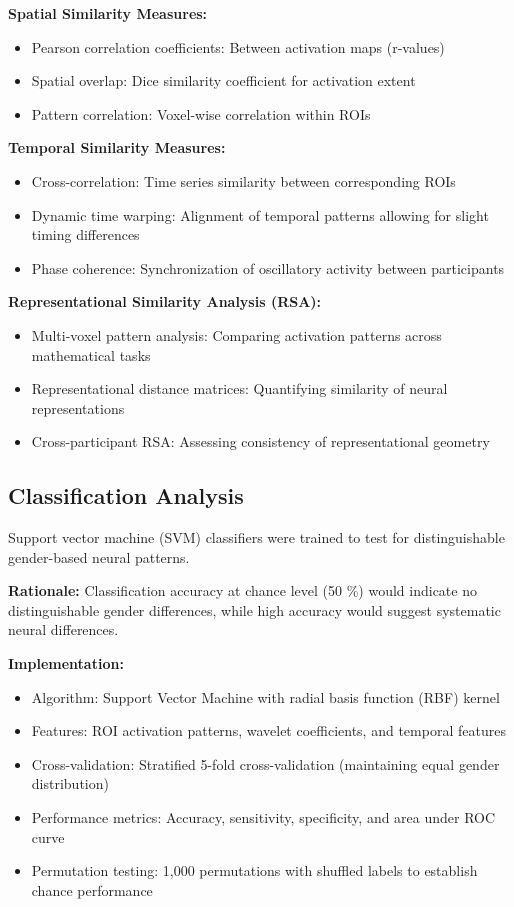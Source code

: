 \vspace{0.5\baselineskip}
\noindent
\textbf{Spatial Similarity Measures:}
\begin{itemize}
\item Pearson correlation coefficients: Between activation maps (r-values)
\item Spatial overlap: Dice similarity coefficient for activation extent
\item Pattern correlation: Voxel-wise correlation within ROIs
\end{itemize}

\noindent
\textbf{Temporal Similarity Measures:}
\begin{itemize}
\item Cross-correlation: Time series similarity between corresponding ROIs
\item Dynamic time warping: Alignment of temporal patterns allowing for slight timing differences
\item Phase coherence: Synchronization of oscillatory activity between participants
\end{itemize}

\noindent
\textbf{Representational Similarity Analysis (RSA):}
\begin{itemize}
\item Multi-voxel pattern analysis: Comparing activation patterns across mathematical tasks
\item Representational distance matrices: Quantifying similarity of neural representations
\item Cross-participant RSA: Assessing consistency of representational geometry
\end{itemize}


\subsection{Classification Analysis}
Support vector machine (SVM) classifiers were trained to test for distinguishable gender-based neural patterns.

\vspace{0.5\baselineskip}
\noindent
\textbf{Rationale:} 
Classification accuracy at chance level (50 \%) would indicate no distinguishable gender differences, while high accuracy would suggest systematic neural differences.

\noindent
\textbf{Implementation:}
\begin{itemize}
\item Algorithm: Support Vector Machine with radial basis function (RBF) kernel
\item Features: ROI activation patterns, wavelet coefficients, and temporal features
\item Cross-validation: Stratified 5-fold cross-validation (maintaining equal gender distribution)
\item Performance metrics: Accuracy, sensitivity, specificity, and area under ROC curve
\item Permutation testing: 1,000 permutations with shuffled labels to establish chance performance
\end{itemize}

